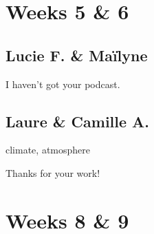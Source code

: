 \documentclass[12pt,oneside]{report}
\begin{document}
\begin{spacing}{1.2}
\section{Weeks 5 \& 6}

\subsection*{Lucie F. \& Maïlyne}

\color{blue}
I haven't got your podcast.
\color{black}

\subsection*{Laure \& Camille A.}

climate, atmosphere

\color{blue}
Thanks for your work!
\color{black}




\section{Weeks 8 \& 9}




\end{spacing}
\end{document}
